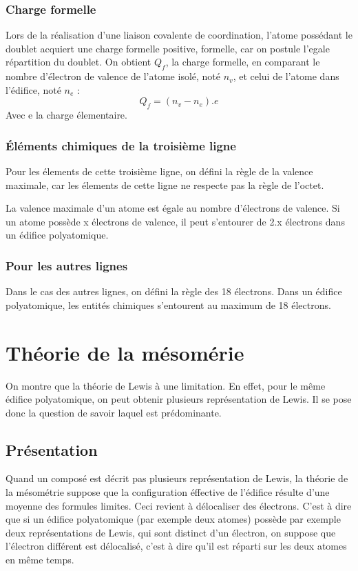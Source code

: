 \subsubsection{Charge formelle}
\begin{de}
Lors de la réalisation d'une liaison covalente de coordination, l'atome possédant le doublet acquiert une charge formelle positive, formelle, car on postule l'egale répartition du doublet. On obtient $Q_f$, la charge formelle, en comparant le nombre d'électron de valence de l'atome isolé, noté $n_v$, et celui de l'atome dans  l'édifice, noté $n_e$ : 
$$Q_f = (n_v - n_e).e$$
Avec e la charge élementaire.
\end{de}
\subsubsection{Éléments chimiques de la troisième ligne}
Pour les élements de cette troisième ligne, on défini la règle de la valence maximale, car les élements de cette ligne ne respecte pas la règle de l'octet.
\begin{de}
La valence maximale d'un atome est égale au nombre d'électrons de valence. Si un atome possède x électrons de valence, il peut s'entourer de 2.x électrons dans un édifice polyatomique.
\end{de}
\subsubsection{Pour les autres lignes}
Dans le cas des autres lignes, on défini la règle des 18 électrons. Dans un édifice polyatomique, les entités chimiques s'entourent au maximum de 18 électrons.
\section{Théorie de la mésomérie}
On montre que la théorie de Lewis à une limitation. En effet, pour le même édifice polyatomique, on peut obtenir plusieurs représentation de Lewis. Il se pose donc la question de savoir laquel est prédominante.
\subsection{Présentation}
Quand un composé est décrit pas plusieurs représentation de Lewis, la théorie de la mésométrie suppose que la configuration éffective de l'édifice résulte d'une moyenne des formules limites. Ceci revient à délocaliser des électrons. C'est à dire que si un édifice polyatomique (par exemple deux atomes) possède par exemple deux représentations de Lewis, qui sont distinct d'un électron, on suppose que l'électron différent est délocalisé, c'est à dire qu'il est réparti sur les deux atomes en même temps.